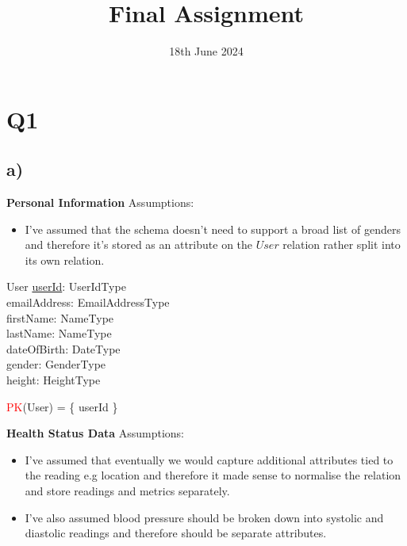 \documentclass{article}
\title{Final Assignment}
\date{\vspace{-1.0cm}18th June 2024}
\begin{document}
\maketitle

\section*{Q1}

\subsection*{\small a)}

\textbf{Personal Information}
\newline \newline Assumptions:
\begin{itemize}
    \item I've assumed that the schema doesn't need to support a broad list of genders and therefore it’s stored as an attribute on the $User$ relation rather split into its own relation.
\end{itemize}

\begin{schema}{User}
	\underline{userId}: UserIdType \\
    emailAddress: EmailAddressType \\
	firstName: NameType \\
	lastName: NameType \\
    dateOfBirth: DateType \\
    gender: GenderType \\
    height: HeightType \\ 
\end{schema}

\begin{zed}
\textcolor{red}{PK}(User) = \{ userId \} \\
\end{zed}

\vspace{0.2cm}
\hspace{-0.5cm}\textbf{Health Status Data}
\newline \newline Assumptions:
\begin{itemize}
  \item I've assumed that eventually we would capture additional attributes tied to the reading e.g location and therefore it made sense to normalise the relation and store readings and metrics separately.
  \item I've also assumed blood pressure should be broken down into systolic and diastolic readings and therefore should be separate attributes.
\end{itemize}
\end{document}
